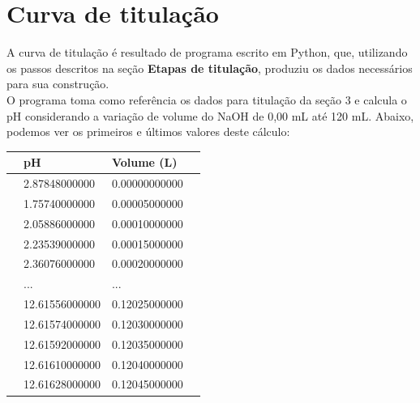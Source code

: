 \documentclass[a4paper, 12pt]{article}
\begin{document}
\section{Curva de titulação}
A curva de titulação é resultado de programa escrito em Python, que, utilizando os passos descritos na seção \textbf{Etapas de titulação}, produziu os dados necessários para sua construção. \\

O programa toma como referência os dados para titulação da seção 3 e calcula o pH considerando a variação de volume do NaOH de 0,00 mL até 120 mL. Abaixo, podemos ver os primeiros e últimos valores deste cálculo:

\begin{table}[H]
	\begin{center}
		\begin{tabular}{lp{5cm}lp{10cm}}\toprule
			& \textbf{pH} & \textbf{Volume (L)} \\ \midrule			
			& 2.87848000000 & 0.00000000000 \\ 
			& 1.75740000000	& 0.00005000000 \\ 
			& 2.05886000000	& 0.00010000000 \\
			& 2.23539000000	& 0.00015000000 \\
			& 2.36076000000	& 0.00020000000 \\
			& ... & ... \\
			& 12.61556000000 & 0.12025000000 \\
			& 12.61574000000 & 0.12030000000 \\
			& 12.61592000000 & 0.12035000000 \\
			& 12.61610000000 & 0.12040000000 \\
			& 12.61628000000 & 0.12045000000 \\			
			\bottomrule
		\end{tabular}
	\end{center}
\end{table}
\end{document}
